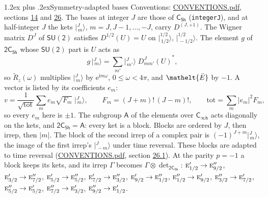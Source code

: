 \documentclass[10pt,a4paper]{article}
\makeatletter
\renewcommand\section{\@startsection{section}{1}{\z@}{-3ex plus -1ex minus -.2ex}%
  {1.2ex plus .2ex}{\normalfont\large\sffamily\bfseries\color{parttitle}}}
\numberwithin{equation}{section}
\newcommand{\eltfont}[1]{{\let\sigma\eltsigma\mathelt{#1}}}
\newcommand{\grp}[1]{\mathsf{#1}}
\newcommand{\irr}[1]{\text{\normalfont\scshape #1}}
\newcommand{\elt}[1]{\eltfont{#1}}
\newcommand{\iunit}{\mathrm{i}}
\newcommand{\expe}{\mathrm{e}}
\newcommand{\irrJp}[2]{D^{(#1,#2)}}
\newcommand{\wignerD}[1]{D^{#1}}
\newcommand{\conj}[1]{{#1}^{*}}
\newcommand{\irrprod}{\otimes}
\newcommand{\jm}[2]{\bigl\lvert{}^{#1}_{\,#2}\bigr\rangle}
\newcommand{\barred}[1]{\bar{#1}}
\newcommand{\lift}[1]{\tilde{#1}}
\makeatother
\begin{document}
\section{Symmetry-adapted bases}\label{s:bases}
Conventions: \href{../../CONVENTIONS.pdf}{CONVENTIONS.pdf}, sections \href{../../../rotation/CONVENTIONS.pdf\#conv.14}{14} and \href{../../CONVENTIONS.pdf\#conv.26}{26}.
\leavevmode\label{n:index.m}\label{n:vector.ket}The bases at integer $J$ are those of \href{../../../rotation/data/pdf/C5h.pdf}{$\grp{C_{5h}}$} (\texttt{integerJ}), and at half-integer $J$ the kets $\jm{J}{m}$, $m = J, J-1, \dots, -J$, carry $\irrJp{J}{+1}$. \label{n:matrix.wigner}The Wigner matrix $\wignerD{J}$ of $\grp{SU(2)}$ satisfies $\wignerD{1/2}(U) = U$ on $\jm{1/2}{1/2}$, $\jm{1/2}{-1/2}$. The element $g$ of $\grp{2C_{5h}}$ whose $\grp{SU(2)}$ part is $U$ acts as
\begin{equation}\label{e:action}g\,\jm{J}{m} = \sum_{m'} \jm{J}{m'}\; \conj{\wignerD{J}_{m m'}(U)},\end{equation}
so $\lift{R}_{z}(\omega)$ multiplies $\jm{J}{m}$ by $\expe^{\iunit m\omega}$, $0 \le \omega < 4\pi$, and $\elt{\barred{E}}$ by $-1$. \label{n:index.ketcoefficient}\label{n:vector.basis.symmetry}\label{n:index.ketweight}\label{n:index.total}A vector is listed by its coefficients $e_m$:
\begin{equation}\label{e:ket}v = \frac{1}{\sqrt{\mathrm{tot}}}\sum_m e_m\sqrt{F_m}\;\jm{J}{m},\qquad F_m = (J+m)!\,(J-m)!,\qquad \mathrm{tot} = \sum_m |e_m|^2F_m,\end{equation}
so every $e_m$ here is $\pm 1$.
\leavevmode\label{n:group.A}The subgroup $\grp{A}$ of the elements over $\grp{C_{\infty h}}$ acts diagonally on the kets, and $\grp{2C_{5h}} = \grp{A}$: every ket is a block. Blocks are ordered by $J$, then irrep, then $|m|$. The block of the second irrep of a complex pair is $(-1)^{J+m}\jm{J}{m}$, the image of the first irrep's $\jm{J}{-m}$ under time reversal. These blocks are adapted to time reversal (\href{../../CONVENTIONS.pdf}{CONVENTIONS.pdf}, section \href{../../CONVENTIONS.pdf\#conv.26.1}{26.1}).
At the parity $p = -1$ a block keeps its kets, and its irrep $\Gamma$ becomes $\Gamma \irrprod \det_{\grp{2C_{5h}}}$: $\irr{e}_{1/2}' \to \irr{e}_{9/2}''$, $\irr{e}_{3/2}' \to \irr{e}_{7/2}''$, $\irr{e}_{5/2}' \to \irr{e}_{5/2}''$, $\irr{e}_{7/2}' \to \irr{e}_{3/2}''$, $\irr{e}_{9/2}' \to \irr{e}_{1/2}''$, $\irr{e}_{1/2}'' \to \irr{e}_{9/2}'$, $\irr{e}_{3/2}'' \to \irr{e}_{7/2}'$, $\irr{e}_{5/2}'' \to \irr{e}_{5/2}'$, $\irr{e}_{7/2}'' \to \irr{e}_{3/2}'$, $\irr{e}_{9/2}'' \to \irr{e}_{1/2}'$.
\end{document}

